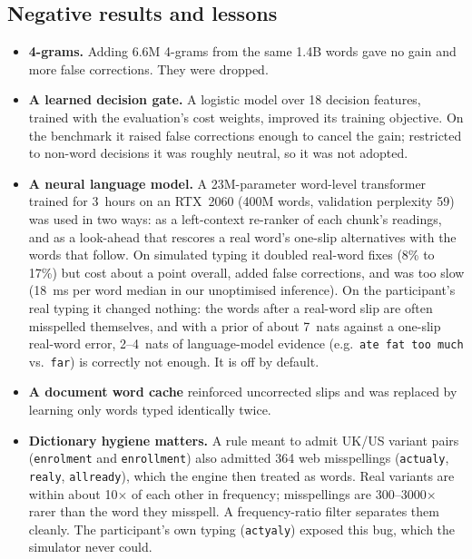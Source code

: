 \documentclass[11pt,a4paper]{article}
\newcommand{\ttw}[1]{\texttt{#1}}
\begin{document}
\subsection{Negative results and lessons}
\label{sec:lessons}
\begin{itemize}
\item \textbf{4-grams.} Adding 6.6M 4-grams from the same 1.4B words gave no gain and more false corrections. They were dropped.
\item \textbf{A learned decision gate.} A logistic model over 18 decision features, trained with the evaluation's cost weights, improved its training objective. On the benchmark it raised false corrections enough to cancel the gain; restricted to non-word decisions it was roughly neutral, so it was not adopted.
\item \textbf{A neural language model.} A 23M-parameter word-level transformer trained for 3~hours on an RTX~2060 (400M words, validation perplexity 59) was used in two ways: as a left-context re-ranker of each chunk's readings, and as a look-ahead that rescores a real word's one-slip alternatives with the words that follow. On simulated typing it doubled real-word fixes (8\% to 17\%) but cost about a point overall, added false corrections, and was too slow (18~ms per word median in our unoptimised inference). On the participant's real typing it changed nothing: the words after a real-word slip are often misspelled themselves, and with a prior of about 7~nats against a one-slip real-word error, 2--4~nats of language-model evidence (e.g.\ \ttw{ate fat too much} vs.\ \ttw{far}) is correctly not enough. It is off by default.
\item \textbf{A document word cache} reinforced uncorrected slips and was replaced by learning only words typed identically twice.
\item \textbf{Dictionary hygiene matters.} A rule meant to admit UK/US variant pairs (\ttw{enrolment} and \ttw{enrollment}) also admitted 364 web misspellings (\ttw{actualy}, \ttw{realy}, \ttw{allready}), which the engine then treated as words. Real variants are within about 10$\times$ of each other in frequency; misspellings are 300--3000$\times$ rarer than the word they misspell. A frequency-ratio filter separates them cleanly. The participant's own typing (\ttw{actyaly}) exposed this bug, which the simulator never could.
\end{itemize}
\end{document}
